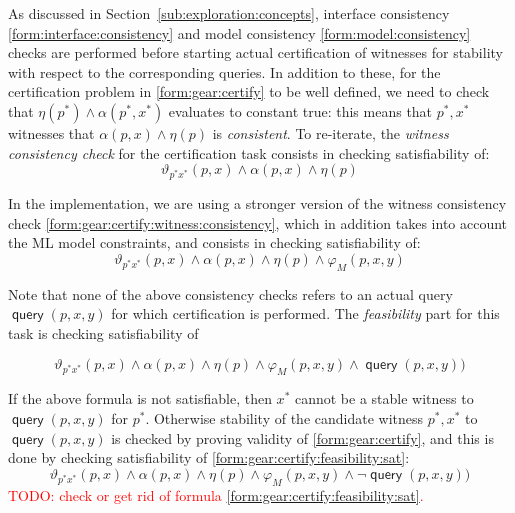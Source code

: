 \documentclass[a4paper,parskip=half]{article} %
\newcommand*\query{\operatorname{\mathsf{query}}}
\newcommand\todozk[1]{\textcolor{red}{#1}}
\newcommand*\ZK{\todozk}
\begin{document}
As discussed in Section~\ref{sub:exploration:concepts}, interface consistency \cref{form:interface:consistency} and
model consistency \cref{form:model:consistency} 
checks are performed before starting actual certification of witnesses for stability with respect to the corresponding queries. 
In addition to these, for the certification problem in \cref{form:gear:certify} to be well defined, 
we need to check that $\eta(p^*) \wedge \alpha(p^*,x^*)$ evaluates to constant true: 
this means that $p^*, x^*$ witnesses that $\alpha(p,x) \wedge \eta(p)$ is \emph{consistent}.
To re-iterate, the \emph{witness consistency check} for the certification task consists in checking satisfiability of:
\begin{equation}\label{form:gear:certify:witness:consistency}
   \vartheta_{p^*x^*}(p,x) \wedge  \alpha(p, x) \wedge \eta(p)
\end{equation}


In the implementation, we are using a stronger version of the witness consistency check  \cref{form:gear:certify:witness:consistency}, 
which in addition takes into account the ML model constraints, and consists in checking satisfiability of:
\begin{equation}\label{form:certify:witness:model:consistency}
\vartheta_{p^*x^*}(p,x) \wedge  \alpha(p, x) \wedge \eta(p) \wedge \varphi_M(p,x,y)
\end{equation}

Note that none of the above consistency checks refers to an actual query $\query(p,x,y)$ for which certification is performed.
The \emph{feasibility} part for this task is checking satisfiability of 

\begin{equation}\label{form:gear:certify:feasibility}
      \vartheta_{p^*x^*}(p,x) \wedge  \alpha(p, x) \wedge \eta(p)  \wedge  \varphi_M(p,x,y) \wedge  \query(p,x,y))
\end{equation}

If the above formula is not satisfiable, then $x^*$ cannot be a stable witness to $\query(p,x,y)$ for $p^*$. 
Otherwise stability of the candidate witness $p^*, x^*$ to 
$\query(p,x,y)$ is checked by proving validity of \cref{form:gear:certify},
and this is done by checking satisfiability of \cref{form:gear:certify:feasibility:sat}:
\begin{equation}\label{form:gear:certify:feasibility:sat}
       \vartheta_{p^*x^*}(p,x) \wedge  \alpha(p, x) \wedge \eta(p)  \wedge  \varphi_M(p,x,y) \wedge \neg \query(p,x,y))
\end{equation}
\ZK{TODO: check or get rid of formula \cref{form:gear:certify:feasibility:sat}.}
\end{document}
